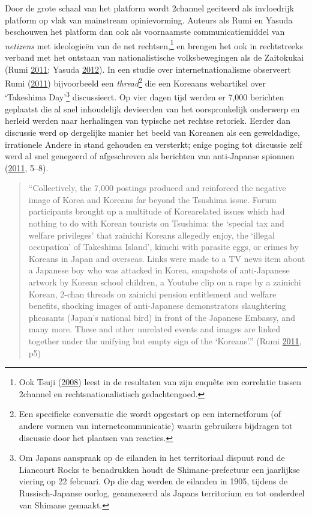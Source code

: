 \documentclass[10.5pt,dutch,]{article}
\begin{document}
Door de grote schaal van het platform wordt 2channel geciteerd als
invloedrijk platform op vlak van mainstream opinievorming. Auteurs als
Rumi en Yasuda beschouwen het platform dan ook als voornaamste
communicatiemiddel van \emph{netizens} met ideologieën van de net
rechtsen,\footnote{Ook Tsuji
  (\protect\hyperlink{ref-tsujiux5fintanettoux5f2008}{2008}) leest in de
  resultaten van zijn enquête een correlatie tussen 2channel en
  rechtsnationalistisch gedachtengoed.} en brengen het ook in
rechtstreeks verband met het ontstaan van nationalistische
volksbewegingen als de Zaitokukai (Rumi
\protect\hyperlink{ref-rumiux5fkoreansux5f2011}{2011}; Yasuda
\protect\hyperlink{ref-yasudaux5fnettoux5f2012}{2012}). In een studie
over internetnationalisme observeert Rumi
(\protect\hyperlink{ref-rumiux5fkoreansux5f2011}{2011}) bijvoorbeeld een
\emph{thread}\footnote{Een specifieke conversatie die wordt opgestart op
  een internetforum (of andere vormen van internetcommunicatie) waarin
  gebruikers bijdragen tot discussie door het plaatsen van reacties.}
die een Koreaans webartikel over `Takeshima Day'\footnote{Om Japans
  aanspraak op de eilanden in het territoriaal dispuut rond de Liancourt
  Rocks te benadrukken houdt de Shimane-prefectuur een jaarlijkse
  viering op 22 februari. Op die dag werden de eilanden in 1905, tijdens
  de Russisch-Japanse oorlog, geannexeerd als Japans territorium en tot
  onderdeel van Shimane gemaakt.} discussieert. Op vier dagen tijd
werden er 7,000 berichten geplaatst die al snel inhoudelijk devieerden
van het oorspronkelijk onderwerp en herleid werden naar herhalingen van
typische net rechtse retoriek. Eerder dan discussie werd op dergelijke
manier het beeld van Koreanen als een geweldadige, irrationele Andere in
stand gehouden en versterkt; enige poging tot discussie zelf werd al
snel genegeerd of afgeschreven als berichten van anti-Japanse spionnen
(\protect\hyperlink{ref-rumiux5fkoreansux5f2011}{2011}, 5--8).

\begin{quote}
``Collectively, the 7,000 postings produced and reinforced the negative
image of Korea and Koreans far beyond the Tsushima issue. Forum
participants brought up a multitude of Korearelated issues which had
nothing to do with Korean tourists on Tsushima: the `special tax and
welfare privileges' that zainichi Koreans allegedly enjoy, the `illegal
occupation' of Takeshima Island', kimchi with parasite eggs, or crimes
by Koreans in Japan and overseas. Links were made to a TV news item
about a Japanese boy who was attacked in Korea, snapshots of
anti-Japanese artwork by Korean school children, a Youtube clip on a
rape by a zainichi Korean, 2-chan threads on zainichi pension
entitlement and welfare benefits, shocking images of anti-Japanese
demonstrators slaughtering pheasants (Japan's national bird) in front of
the Japanese Embassy, and many more. These and other unrelated events
and images are linked together under the unifying but empty sign of the
`Koreans'.'' (Rumi
\protect\hyperlink{ref-rumiux5fkoreansux5f2011}{2011}, p5)
\end{quote}
\end{document}
